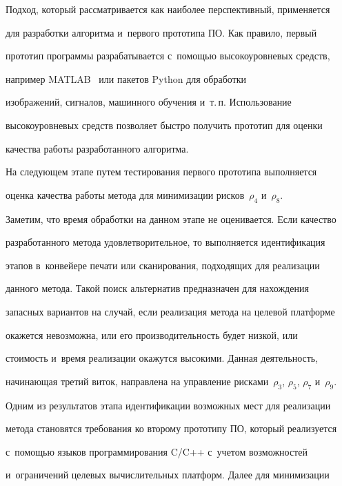 Подход, который рас\-смат\-ри\-ва\-ет\-ся как наиболее перспективный, применяется 


для разработки алгоритма и~первого прототипа ПО. Как правило, первый 


прототип программы разрабатывается с~по\-мощью высокоуровневых средств, 


например \mbox{MATLAB}~\cite{12-mat} или пакетов Python для обработки 


изображений, сигналов, машинного обуче\-ния и~т.\,п. Использование 


высокоуровневых средств поз\-во\-ля\-ет быст\-ро получить прототип для оценки 


качества работы разработанного ал\-го\-ритма. 


   


  На следующем этапе путем тестирования первого прототипа выполняется 


оцен\-ка качества работы метода для минимизации рис\-ков~$\rho_4$ и~$\rho_8$. 


Заметим, что время обработки на данном этапе не оценивается. Если качество 


разработанного метода удовле\-тво\-ри\-тель\-ное, то выполняется идентификация 


этапов в~конвейере печати или сканирования, подходящих для реализации 


данного метода. Такой поиск альтернатив пред\-на\-зна\-чен для на\-хож\-де\-ния 


запасных вариантов на случай, если реализация метода на целевой платформе 


окажется не\-воз\-мож\-на, или его про\-из\-во\-ди\-тель\-ность будет низ\-кой, или 


сто\-и\-мость и~время реализации окажутся высокими. Данная дея\-тель\-ность, 


на\-чи\-на\-ющая третий виток, на\-прав\-ле\-на на управ\-ле\-ние рисками~$\rho_3$, $\rho_5$, $\rho_7$ и~$\rho_9$. 





  Одним из результатов этапа идентификации воз\-мож\-ных мест для реализации 


метода становятся требования ко второму прототипу ПО, который реализуется 


с~по\-мощью языков программирования C/C++ с~учетом возможностей 


и~ограничений целевых вы\-чис\-ли\-тель\-ных платформ. Далее для минимизации 


